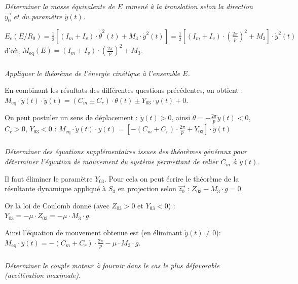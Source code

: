 \documentclass[10pt,fleqn]{article} %
\begin{document}
\begin{multicols}{2}
\subparagraph{}\textit{Déterminer la masse équivalente de $E$ ramené à la translation selon la direction $\overrightarrow{y_0}$ et du paramètre $\dot{y}(t)$.}
\ifprof\begin{corrige}
$E_c(E/R_0)=\frac{1}{2}\left[\left(I_m+I_v\right)\cdot \dot{\theta}^2(t)+ M_3\cdot \dot{y}^2(t)\right]
=\frac{1}{2}\left[\left(I_m+I_v\right)\cdot \left(\frac{2\pi}{p}\right)^2+ M_3\right]\cdot \dot{y}^2(t)$
d'où,
$
M_{\text{eq}}(E)=\left(I_m+I_v\right)\cdot \left(\frac{2\pi}{p}\right)^2+ M_3
$.

\end{corrige}\else\fi


\subparagraph{}\textit{Appliquer le théorème de l'énergie cinétique à l'ensemble $E$.}

\ifprof\begin{corrige}
En combinant les résultats des différentes questions précédentes, on obtient : 
$M_{\text{eq}}\cdot \dot{y}(t)\cdot \ddot{y}(t)=\left(C_m\pm C_r\right)\cdot \dot{\theta}(t)\pm Y_{03}\cdot \dot{y}(t)+0
$.

On peut postuler un sens de déplacement : $\dot{y}(t)>0$, ainsi $\dot{\theta}=-\frac{2\pi}{p}\dot{y}(t)<0$,  $C_r>0$, $Y_{03}<0$ : 
$
M_{\text{eq}}\cdot \dot{y}(t)\cdot \ddot{y}(t)=\left[-\left(C_m+ C_r\right)\cdot \frac{2\pi}{p}+ Y_{03}\right]\cdot \dot{y}(t)$
\end{corrige}\else\fi



\subparagraph{}\textit{Déterminer des équations supplémentaires issues des théorèmes généraux pour déterminer l'équation de mouvement du système permettant de relier $C_m$ à $y(t)$.}

\ifprof\begin{corrige}
Il faut éliminer le paramètre $Y_{03}$. Pour cela on peut écrire le théorème de la résultante dynamique appliqué à $S_3$ en projection selon $\overrightarrow{z_0}$ : 
$Z_{03}-M_3\cdot g=0$.

Or la loi de Coulomb donne (avec $Z_{03}>0$ et $Y_{03}<0$) : 
$Y_{03}=-\mu\cdot Z_{03}=-\mu\cdot M_3\cdot g$.

Ainsi l'équation de mouvement obtenue est (en éliminant $\dot{y}(t)\neq 0$): 
$
\boxed{
M_{\text{eq}}\cdot \ddot{y}(t)=-\left(C_m+ C_r\right)\cdot \frac{2\pi}{p}- \mu\cdot M_3\cdot g
}$. 
\end{corrige}\else\fi

\subparagraph{}\textit{Déterminer le couple moteur à fournir dans le cas le plus défavorable (accélération maximale).}


\end{multicols}
\end{document}
